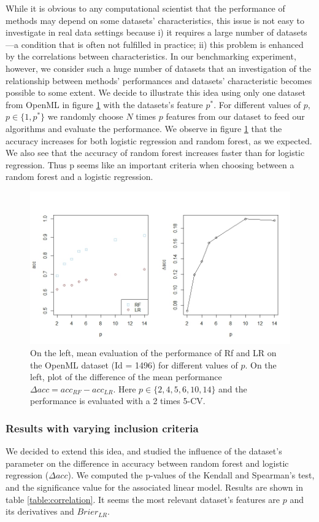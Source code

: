 \documentclass[12pt]{article}
\begin{document}
While it is obvious to any computational scientist that the performance of methods may depend on some datasets' characteristics, this issue is not easy to investigate in real data settings because i) it requires a large number of datasets---a condition that is often not fulfilled in practice; ii) this problem is enhanced by the correlations between characteristics. In our benchmarking experiment, however, we consider such a huge number of datasets that an investigation of the relationship between methods' performances and datasets' characteristic becomes possible to some extent. We decide to illustrate this idea using only one dataset from OpenML in figure \ref{fig:DatasetDifferentp} with the datasets's feature $p^*$. For different values of $p$, $p \in \{1,p^*\}$ we randomly choose $N$ times $p$ features from our dataset to feed our algorithms and evaluate the performance. We observe in figure \ref{fig:DatasetDifferentp} that the accuracy increases for both logistic regression and random forest, as we expected. We also see that the accuracy of random forest increases faster than for logistic regression. Thus p seems like an important criteria when choosing between a random forest and a logistic regression.



\begin{figure}[h]
	\centerline{
		\includegraphics[width=12cm]{Images/Results/Dataset2p.jpeg}}
	\caption{On the left, mean evaluation of the performance of Rf and LR on the OpenML dataset (Id = 1496) for different values of $p$. On the left, plot of the difference of the mean performance $\Delta acc = acc_{RF}-acc_{LR}$. Here $p \in \{2,4,5,6,10,14\}$ and the performance is evaluated with a 2 times 5-CV.}
	\label{fig:DatasetDifferentp}
\end{figure}


\subsubsection{Results with varying inclusion criteria}
We decided to extend this idea, and studied the influence of the dataset's parameter on the difference in accuracy between random forest and logistic regression ($\Delta acc$). We computed the p-values of the Kendall and Spearman's test, and the significance value for the associated linear model. Results are shown in table \ref{table:correlation}. It seems the most relevant dataset's features are $p$ and its derivatives and $Brier_{LR}$.
\end{document}

